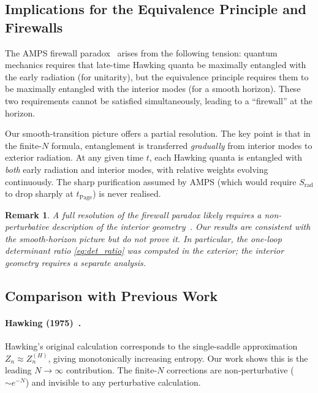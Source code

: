 \documentclass[12pt,a4paper]{article}
\newtheorem{remark}[theorem]{Remark}
\newcommand{\tPage}{t_{\mathrm{Page}}}
\begin{document}
\subsection{Implications for the Equivalence Principle and Firewalls}
\label{subsec:firewall}

The AMPS firewall paradox~\citep{Almheiri2013} arises from the following
tension: quantum mechanics requires that late-time Hawking quanta be
maximally entangled with the early radiation (for unitarity), but the
equivalence principle requires them to be maximally entangled with the
interior modes (for a smooth horizon).  These two requirements cannot be
satisfied simultaneously, leading to a ``firewall'' at the horizon.

Our smooth-transition picture offers a partial resolution.  The key point
is that in the finite-$N$ formula, entanglement is transferred
\emph{gradually} from interior modes to exterior radiation.  At any given
time $t$, each Hawking quanta is entangled with \emph{both} early radiation
and interior modes, with relative weights evolving continuously.  The
sharp purification assumed by AMPS (which would require $S_{\mathrm{rad}}$
to drop sharply at $\tPage$) is never realised.

\begin{remark}
A full resolution of the firewall paradox likely requires a non-perturbative
description of the interior geometry~\citep{Maldacena2013,Papadodimas2013}.
Our results are consistent with the smooth-horizon picture but do not prove
it.  In particular, the one-loop determinant ratio
\cref{eq:det_ratio} was computed in the exterior; the interior geometry
requires a separate analysis.
\end{remark}

\subsection{Comparison with Previous Work}
\label{subsec:comparison_literature}

\paragraph{Hawking (1975)~\citep{Hawking1975}.}
Hawking's original calculation corresponds to the single-saddle approximation
$Z_n \approx Z_n^{(H)}$, giving monotonically increasing entropy.  Our work
shows this is the leading $N \to \infty$ contribution.  The finite-$N$
corrections are non-perturbative ($\sim e^{-N}$) and invisible to any
perturbative calculation.
\end{document}
